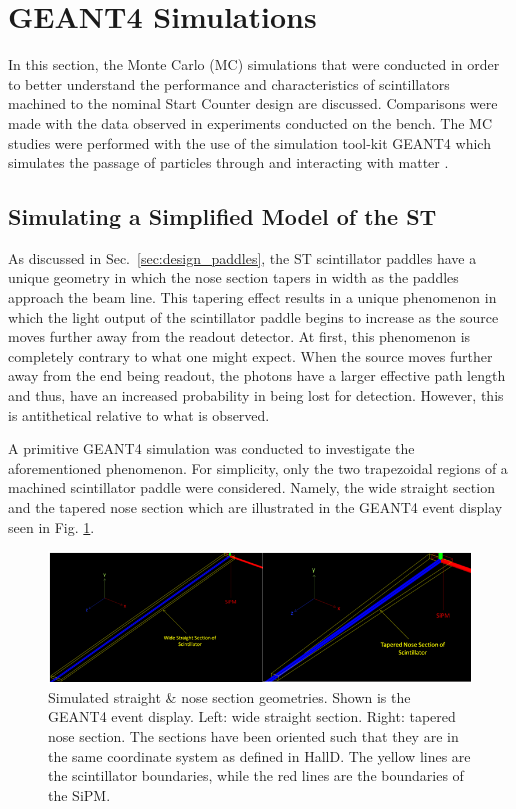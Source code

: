\section{GEANT4 Simulations} \label{sec:sim}

In this section, the Monte Carlo (MC) simulations that were conducted in order to better understand the performance and characteristics of scintillators machined to the nominal \gx{} Start Counter design are discussed.  Comparisons were made with the data observed in experiments conducted on the bench.  The MC studies were performed with the use of the simulation tool-kit GEANT4 which simulates the passage of particles through and interacting with matter \cite{geant4_website}.

\subsection{Simulating a Simplified Model of the ST} \label{sec:sim_simple}

As discussed in Sec.~\ref{sec:design_paddles}, the ST scintillator paddles have a unique geometry in which the nose section tapers in width as the paddles approach the beam line.  This tapering effect results in a unique phenomenon in which the light output of the scintillator paddle begins to increase as the source moves further away from the readout detector.  At first, this phenomenon is completely contrary to what one might expect. When the source moves further away from the end being readout, the photons have a larger effective path length and thus, have an increased probability in being lost for detection.  However, this is antithetical relative to what is observed.

A primitive GEANT4 simulation was conducted to investigate the aforementioned phenomenon. For simplicity, only the two trapezoidal regions of a machined scintillator paddle were considered.  Namely, the wide straight section and the tapered nose section which are illustrated in the GEANT4 event display  seen in Fig. \ref{fig:beam_off}.
	\begin{figure}[!htb]
	\centering
	\includegraphics[width=1.0\columnwidth]{simulation/figs/beam_off}
	\caption{Simulated straight \& nose section geometries.  Shown is the GEANT4 event display.  Left: wide straight section.  Right: tapered nose section.  The sections have been oriented such that they are in the same coordinate system as defined in HallD.  The yellow lines are the scintillator boundaries, while the red lines are the boundaries of the SiPM.}
	\label{fig:beam_off}
	\end{figure}  

